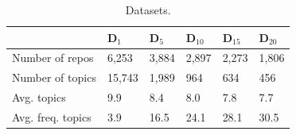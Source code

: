 %


\begin{table}[h!]
	\caption{Datasets.}
	\begin{tabular}{|l|p{0.68cm}|p{0.68cm}|p{0.68cm}|p{0.68cm}|p{0.68cm}|} \hline
		 & \textbf{ D$_{1}$} & \textbf{D$_{5}$} & \textbf{ D$_{10}$} & \textbf{D$_{15}$} & \textbf{D$_{20}$} \\ \hline
		Number of repos & 6,253 & 3,884 & 2,897  & 2,273 & 1,806  \\ \hline
		Number of topics & 15,743 & 1,989 & 964 & 634 & 456 \\ \hline
		Avg. topics & 9.9 & 8.4 & 8.0  & 7.8 & 7.7 \\ \hline
		Avg. freq. topics & 3.9  & 16.5  & 24.1  & 28.1  & 30.5  \\ \hline
	\end{tabular}	
	\label{tab:Datasets}	
\end{table}



